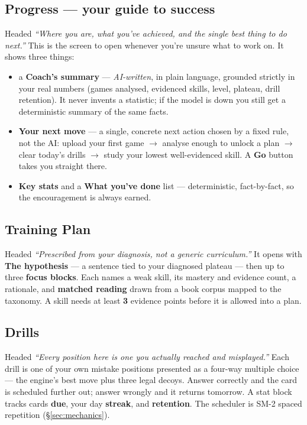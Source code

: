 \documentclass[11pt]{article}
\begin{document}
\subsection{Progress --- your guide to success}

Headed \emph{``Where you are, what you've achieved, and the single best thing to
do next.''} This is the screen to open whenever you're unsure what to work on. It
shows three things:
\begin{itemize}[leftmargin=1.4em, itemsep=1pt]
  \item a \textbf{Coach's summary} --- \emph{AI-written}, in plain language,
  grounded strictly in your real numbers (games analysed, evidenced skills,
  level, plateau, drill retention). It never invents a statistic; if the model
  is down you still get a deterministic summary of the same facts.
  \item \textbf{Your next move} --- a single, concrete next action chosen by a
  fixed rule, not the AI: upload your first game $\rightarrow$ analyse enough to
  unlock a plan $\rightarrow$ clear today's drills $\rightarrow$ study your
  lowest well-evidenced skill. A \textbf{Go} button takes you straight there.
  \item \textbf{Key stats} and a \textbf{What you've done} list --- deterministic,
  fact-by-fact, so the encouragement is always earned.
\end{itemize}

\subsection{Training Plan}

Headed \emph{``Prescribed from your diagnosis, not a generic curriculum.''} It
opens with \textbf{The hypothesis} --- a sentence tied to your diagnosed plateau
--- then up to three \textbf{focus blocks}. Each names a weak skill, its mastery
and evidence count, a rationale, and \textbf{matched reading} drawn from a book
corpus mapped to the taxonomy. A skill needs at least \textbf{3} evidence points
before it is allowed into a plan.

\subsection{Drills}

Headed \emph{``Every position here is one you actually reached and misplayed.''}
Each drill is one of your own mistake positions presented as a four-way
multiple choice --- the engine's best move plus three legal decoys. Answer
correctly and the card is scheduled further out; answer wrongly and it returns
tomorrow. A stat block tracks cards \textbf{due}, your day \textbf{streak}, and
\textbf{retention}. The scheduler is SM-2 spaced repetition (\S\ref{sec:mechanics}).
\end{document}
